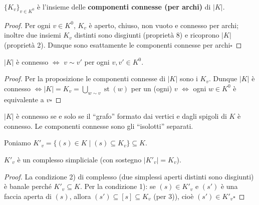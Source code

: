 \begin{prop}
$\{ K_v \}_{v \in K^0}$ \`e l'insieme delle \textbf{componenti connesse (per archi)} di $|K|$.
\end{prop}
\begin{proof}
Per ogni $v \in K^0$, $K_v$ \`e aperto, chiuso, non vuoto e connesso per archi; inoltre due insiemi $K_v$ distinti sono disgiunti (propriet\`a 8) e ricoprono $|K|$ (propriet\`a 2). Dunque sono esattamente le componenti connesse per archi\hfill$\square$
\end{proof}

\begin{coro}
$|K|$ \`e connesso $\iff$ $v \sim v'$ per ogni $v, v' \in K^0$.
\end{coro}
\begin{proof}
Per la proposizione le componenti connesse di $|K|$ sono i $K_v$. Dunque $|K|$ \`e connesso $\iff |K| = K_v = \bigcup_{w \sim v} \operatorname{st}(w)$ per un (ogni) $v$ $\iff$ ogni $w \in K^0$ \`e equivalente a $v$\hfill$\square$
\end{proof}

\begin{intuizione}
$|K|$ \`e connesso se e solo se il ``grafo'' formato dai vertici e dagli spigoli di $K$ \`e connesso. Le componenti connesse sono gli ``isolotti'' separati.
\end{intuizione}

Poniamo $K'_v = \{ (s) \in K \mid (s) \subseteq K_v \} \subseteq K$.

\begin{prop}
$K'_v$ \`e un complesso simpliciale (con sostegno $|K'_v| = K_v$).
\end{prop}
\begin{proof}
La condizione 2) di complesso (due simplessi aperti distinti sono disgiunti) \`e banale perch\'e $K'_v \subseteq K$. Per la condizione 1): se $(s) \in K'_v$ e $(s')$ \`e una faccia aperta di $(s)$, allora $(s') \subseteq [s] \subseteq K_v$ (per 3)), cio\`e $(s') \in K'_v$\hfill$\square$
\end{proof}


